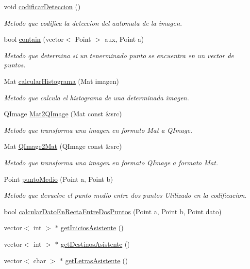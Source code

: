 \begin{DoxyCompactItemize}
void \hyperlink{classCOperacionesImagen_a952788db3b5e11e43fb85c7e805a5dd2}{codificar\+Deteccion} ()
\begin{DoxyCompactList}\small\item\em Metodo que codifica la deteccion del automata de la imagen. \end{DoxyCompactList}\item 
bool \hyperlink{classCOperacionesImagen_ae0b1cc753d1c4f62a2c9dce6f213ba95}{contain} (vector$<$ Point $>$ aux, Point a)
\begin{DoxyCompactList}\small\item\em Metodo que determina si un tenerminado punto se encuentra en un vector de puntos. \end{DoxyCompactList}\item 
Mat \hyperlink{classCOperacionesImagen_aa40399f6525ea0e3b76a246e5cccdc06}{calcular\+Histograma} (Mat imagen)
\begin{DoxyCompactList}\small\item\em Metodo que calcula el histograma de una determinada imagen. \end{DoxyCompactList}\item 
Q\+Image \hyperlink{classCOperacionesImagen_a81462b6d034a47905ff9ea337349042e}{Mat2\+Q\+Image} (Mat const \&src)
\begin{DoxyCompactList}\small\item\em Metodo que transforma una imagen en formato Mat a Q\+Image. \end{DoxyCompactList}\item 
Mat \hyperlink{classCOperacionesImagen_a9aa86962598a4354e95168ee6645e4e7}{Q\+Image2\+Mat} (Q\+Image const \&src)
\begin{DoxyCompactList}\small\item\em Metodo que transforma una imagen en formato Q\+Image a formato Mat. \end{DoxyCompactList}\item 
Point \hyperlink{classCOperacionesImagen_a677a389169905ef82c72251a61b9e6c4}{punto\+Medio} (Point a, Point b)
\begin{DoxyCompactList}\small\item\em Metodo que devuelve el punto medio entre dos puntos Utilizado en la codificacion. \end{DoxyCompactList}\item 
bool \hyperlink{classCOperacionesImagen_aee6792b8b663653a0f925425e64365af}{calcular\+Dato\+En\+Recta\+Entre\+Dos\+Puntos} (Point a, Point b, Point dato)
\item 
vector$<$ int $>$ $\ast$ \hyperlink{classCOperacionesImagen_ad5c112e87e404665daefa2ce914a5730}{get\+Inicios\+Asistente} ()
\item 
vector$<$ int $>$ $\ast$ \hyperlink{classCOperacionesImagen_a896089ecf4cdc7b2d8be60922cb76a93}{get\+Destinos\+Asistente} ()
\item 
vector$<$ char $>$ $\ast$ \hyperlink{classCOperacionesImagen_aed11fc22a2d59e9bd5a30d38fb339e9d}{get\+Letras\+Asistente} ()
\end{DoxyCompactItemize}
